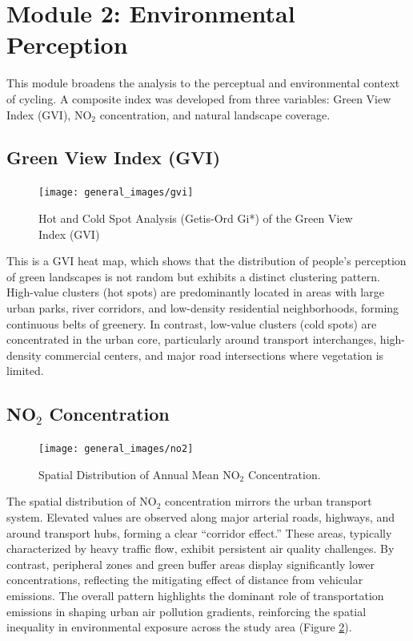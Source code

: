 \documentclass[
  12pt,
  oneside]{book}
\begin{document}
\section{Module 2: Environmental Perception}\label{module-2-environmental-perception}

This module broadens the analysis to the perceptual and environmental context of cycling. A composite index was developed from three variables: Green View Index (GVI), NO\(_2\) concentration, and natural landscape coverage.

\subsection{Green View Index (GVI)}\label{green-view-index-gvi}

\begin{figure}

{\centering \texttt{[image: general\_images/gvi]} 

}

\caption{Hot and Cold Spot Analysis (Getis-Ord Gi*) of the Green View Index (GVI)}\label{fig:gvi}
\end{figure}

This is a GVI heat map, which shows that the distribution of people's perception of green landscapes is not random but exhibits a distinct clustering pattern. High-value clusters (hot spots) are predominantly located in areas with large urban parks, river corridors, and low-density residential neighborhoods, forming continuous belts of greenery. In contrast, low-value clusters (cold spots) are concentrated in the urban core, particularly around transport interchanges, high-density commercial centers, and major road intersections where vegetation is limited.

\subsection{\texorpdfstring{NO\(_2\) Concentration}{NO\_2 Concentration}}\label{no_2-concentration}

\begin{figure}

{\centering \texttt{[image: general\_images/no2]} 

}

\caption{Spatial Distribution of Annual Mean NO$_2$ Concentration.}\label{fig:no2}
\end{figure}

The spatial distribution of NO\(_2\) concentration mirrors the urban transport system. Elevated values are observed along major arterial roads, highways, and around transport hubs, forming a clear ``corridor effect.'' These areas, typically characterized by heavy traffic flow, exhibit persistent air quality challenges. By contrast, peripheral zones and green buffer areas display significantly lower concentrations, reflecting the mitigating effect of distance from vehicular emissions. The overall pattern highlights the dominant role of transportation emissions in shaping urban air pollution gradients, reinforcing the spatial inequality in environmental exposure across the study area (Figure \ref{fig:no2}).
\end{document}
